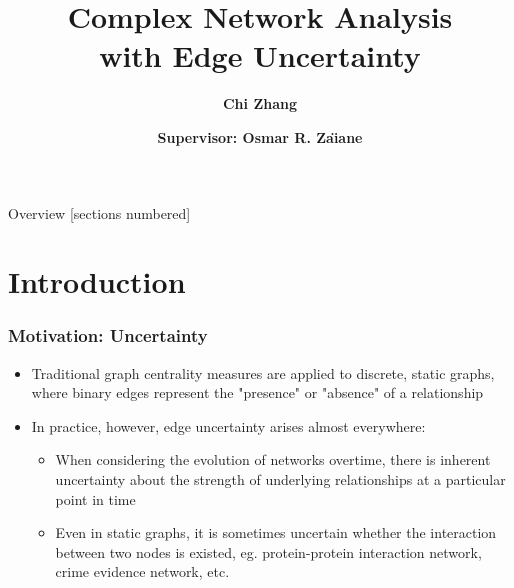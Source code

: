 \documentclass[9pt]{beamer}
\title{Complex Network Analysis \\
with Edge Uncertainty}
\date{\textbf{Supervisor: Osmar R. Za\"{\i}ane}}
\author{\textbf{Chi Zhang}}
\institute{March 27, 2018}
\begin{document}
\maketitle

\begin{frame}{Overview}
  [sections numbered]
  \vspace{0.1in}
  \tableofcontents
\end{frame}

\section{Introduction}

\begin{frame}
\frametitle{Motivation: Uncertainty}
\begin{itemize}
\item Traditional graph centrality measures are applied to discrete, static graphs, where binary edges represent the "presence" or "absence" of a relationship
\item In practice, however, edge uncertainty arises almost everywhere:
\begin{itemize}
\item When considering the evolution of networks overtime, there is inherent uncertainty about the strength of underlying relationships at a particular point in time
\item Even in static graphs, it is sometimes uncertain whether the interaction between two nodes is existed, eg. protein-protein interaction network, crime evidence network, etc.
\end{itemize}
\end{itemize}
\end{frame}
\end{document}
